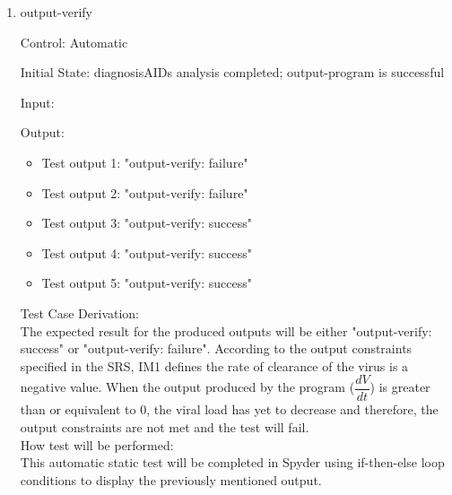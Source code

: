 \documentclass[12pt, titlepage]{article}
\newcounter{tinnum} %
\begin{document}
\begin{enumerate}
\begin{enumerate}
					
\item{output-verify\\}

Control: Automatic
					
Initial State: diagnosisAIDs analysis completed; output-program is successful
					
Input:
\begin{itemize}
\item[Test input \refstepcounter{tinnum}\thetinnum\label{Tinput_16}:] 
$\dfrac{dV}{dt} = 1.3$ %
\item[Test input \refstepcounter{tinnum}\thetinnum\label{Tinput_17}:] 
$\dfrac{dV}{dt} = 0$ %
\item[Test input \refstepcounter{tinnum}\thetinnum\label{Tinput_18}:] 
$\dfrac{dV}{dt} = -0.3$
\item[Test input \refstepcounter{tinnum}\thetinnum\label{Tinput_19}:]
$\dfrac{dV}{dt} = -0.7$ 
\item[Test input \refstepcounter{tinnum}\thetinnum\label{Tinput_20}:]
}$\dfrac{dV}{dt} = -0.9$ 
\end{itemize}


Output: 
\begin{itemize}
\item Test output 1: "output-verify: failure"
\item Test output 2: "output-verify: failure" 
\item Test output 3: "output-verify: success"
\item Test output 4: "output-verify: success"
\item Test output 5: "output-verify: success"
\end{itemize}

Test Case Derivation:\\
The expected result for the produced outputs will be either "output-verify: 
success" or  "output-verify: failure". According to the output constraints 
specified in the SRS, IM1 defines the rate of clearance of the virus is a 
negative value. When the output produced by the program ($\dfrac{dV}{dt}$) is 
greater than or equivalent to 0, the viral load has yet to decrease and 
therefore, the output constraints are not met and the test will fail.\\

How test will be performed: \\
This automatic static test will be completed in Spyder using if-then-else loop 
conditions to display the previously mentioned output. \\


\end{enumerate}
\end{enumerate}
\end{document}
